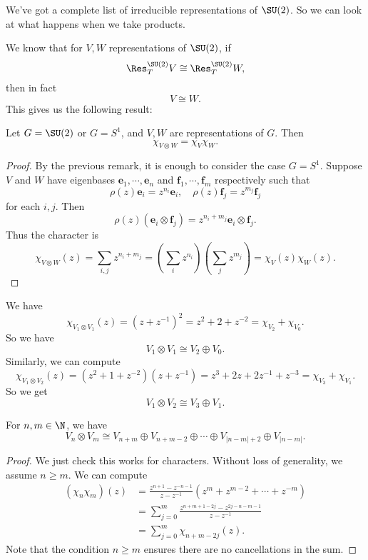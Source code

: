 \documentclass[a4paper]{article}
\begin{document}
We've got a complete list of irreducible representations of $\SU(2)$. So we can look at what happens when we take products.

We know that for $V, W$ representations of $\SU(2)$, if
\[
  \Res_T^{\SU(2)}V \cong \Res_T^{\SU(2)}W,
\]
then in fact
\[
  V \cong W.
\]
This gives us the following result:
\begin{prop}
  Let $G = \SU(2)$ or $G = S^1$, and $V, W$ are representations of $G$. Then
  \[
    \chi_{V \otimes W} = \chi_V \chi_W.
  \]
\end{prop}

\begin{proof}
  By the previous remark, it is enough to consider the case $G = S^1$. Suppose $V$ and $W$ have eigenbases $\mathbf{e}_1, \cdots, \mathbf{e}_n$ and $\mathbf{f}_1, \cdots, \mathbf{f}_m$ respectively such that
  \[
    \rho(z) \mathbf{e}_i = z^{n_i} \mathbf{e}_i,\quad \rho(z) \mathbf{f}_j = z^{m_j} \mathbf{f}_j
  \]
  for each $i, j$. Then
  \[
    \rho(z)(\mathbf{e}_i\otimes \mathbf{f}_j) = z^{n_i + m_j} \mathbf{e}_i \otimes \mathbf{f}_j.
  \]
  Thus the character is
  \[
    \chi_{V \otimes W}(z) = \sum_{i, j} z^{n_i + m_j} = \left(\sum_i z^{n_i}\right) \left(\sum_j z^{m_j}\right) = \chi_V(z) \chi_W(z).
  \]
\end{proof}

\begin{eg}
  We have
  \[
    \chi_{V_1 \otimes V_1}(z) = (z + z^{-1})^2 = z^2 + 2 + z^{-2} = \chi_{V_2} + \chi_{V_0}.
  \]
  So we have
  \[
    V_1 \otimes V_1 \cong V_2 \oplus V_0.
  \]
  Similarly, we can compute
  \[
    \chi_{V_1 \otimes V_2}(z) = (z^2 + 1 + z^{-2})(z + z^{-1}) = z^3 + 2z + 2z^{-1} + z^{-3} = \chi_{V_3} + \chi_{V_1}.
  \]
  So we get
  \[
    V_1 \otimes V_2 \cong V_3 \oplus V_1.
  \]
\end{eg}

\begin{prop}
  For $n, m \in \N$, we have
  \[
    V_n \otimes V_m \cong V_{n + m} \oplus V_{n + m - 2} \oplus \cdots \oplus V_{|n - m| + 2} \oplus V_{|n - m|}.
  \]
\end{prop}

\begin{proof}
  We just check this works for characters. Without loss of generality, we assume $n \geq m$. We can compute
  \begin{align*}
    (\chi_n \chi_m)(z) &= \frac{z^{n + 1} - z^{-n - 1}}{z - z^{-1}} (z^m + z^{m - 2} + \cdots + z^{-m})\\
    &= \sum_{j = 0}^m \frac{z^{n + m + 1 - 2j} - z^{2j - n - m - 1}}{z - z^{-1}}\\
    &= \sum_{j = 0}^m \chi_{n + m - 2j}(z).
  \end{align*}
  Note that the condition $n \geq m$ ensures there are no cancellations in the sum.
\end{proof}
\end{document}
